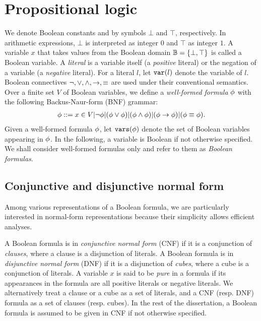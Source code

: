 \section{Propositional logic}
\label{sect:background-propositional-logic}

We denote Boolean constants \false and \true by symbols $\bot$ and $\top$, respectively.
In arithmetic expressions, $\bot$ is interpreted as integer $0$ and $\top$ as integer $1$.
A variable $x$ that takes values from the Boolean domain $\mathbb{B}=\{\bot,\top\}$ is called a Boolean variable.
A \textit{literal} is a variable itself (a \textit{positive} literal) or the negation of a variable (a \textit{negative} literal).
For a literal $l$, let $\texttt{var}(l)$ denote the variable of $l$.
Boolean connectives $\lnot, \lor, \land, \rightarrow, \equiv$ are used under their conventional semantics.
Over a finite set $V$ of Boolean variables,
we define a \textit{well-formed formula} $\phi$ with the following Backus-Naur-form (BNF) grammar:
\begin{align}
    \phi ::= x\in V | \lnot\phi | (\phi\lor\phi) | (\phi\land\phi) | (\phi\rightarrow\phi) | (\phi\equiv\phi).
\end{align}
Given a well-formed formula $\phi$, let $\texttt{vars}(\phi)$ denote the set of Boolean variables appearing in $\phi$.
In the following, a variable is Boolean if not otherwise specified.
We shall consider well-formed formulas only and refer to them as \textit{Boolean formulas}.

\subsection{Conjunctive and disjunctive normal form}
Among various representations of a Boolean formula,
we are particularly interested in normal-form representations because their simplicity allows efficient analyses.

A Boolean formula is in \textit{conjunctive normal form} (CNF) if it is a conjunction of \textit{clauses},
where a clause is a disjunction of literals.
A Boolean formula is in \textit{disjunctive normal form} (DNF) if it is a disjunction of \textit{cubes},
where a cube is a conjunction of literals.
A variable $x$ is said to be \textit{pure} in a formula if its appearances in the formula are all positive literals or negative literals.
We alternatively treat a clause or a cube as a set of literals,
and a CNF (resp. DNF) formula as a set of clauses (resp. cubes).
In the rest of the dissertation, a Boolean formula is assumed to be given in CNF if not otherwise specified.

